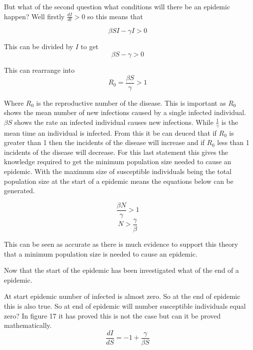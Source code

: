 \documentclass[final]{cmpreport}
\begin{document}
	But what of the second question	what conditions will there be an epidemic happen? Well firstly $\frac{dI}{dt} > 0$ so this means that 
	
	\begin{equation}\beta SI - \gamma I>0\end{equation}
	
	This can be divided by $I$ to get 
	\begin{equation}\beta S - \gamma >0\end{equation}
	
	This can rearrange into
	\begin{equation}R_0=\frac{\beta S}{\gamma} >1\end{equation}
	
	Where $R_0$ is the reproductive number of the disease. This is important as $R_0$ shows the mean number of new infections caused by a single infected individual. $\beta S$ shows the rate an infected individual causes new infections. While $\frac{1}{\gamma}$ is the mean time an individual is infected. From this it be can deuced that if  $R_0$ is greater than 1 then the incidents of the disease will increase  and if $R_0$ less than 1 incidents of the disease will decrease. For this last statement this gives the knowledge required to get the minimum population size needed to cause an epidemic. With the maximum size of susceptible individuals being the total population size at the start of a epidemic means the equations below can be generated.
	
	\begin{equation} \frac{\beta N}{\gamma} >1\end{equation}
	\begin{equation} N>\frac{\gamma}{\beta}\end{equation}
	
	This can be seen as accurate as there is much evidence to support this theory that a minimum population size is needed to cause an epidemic.

	Now that the start of the epidemic has been investigated what of the end of a epidemic.
	
	At start epidemic number of infected is almost zero. So at the end of epidemic this is also true. So at end of epidemic will number susceptible individuals equal zero? In figure 17 it has proved this is not the case but can it be proved mathematically.
	\begin{equation}\frac{dI}{dS}= -1 + \frac{\gamma}{\beta S}	\end{equation}
	
\end{document}
